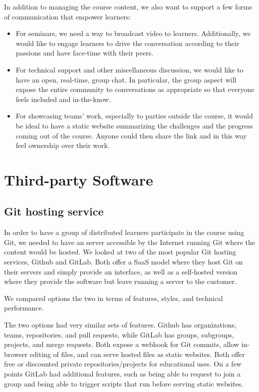 \documentclass[12pt,twoside,vi]{mitthesis}
\begin{document}
In addition to managing the course content, we also want to support a few forms of communication that empower learners:
\begin{itemize}
\item For seminars, we need a way to broadcast video to learners. Additionally, we would like to engage learners to drive the conversation according to their passions and have face-time with their peers.
\item For technical support and other miscellaneous discussion, we would like to have an open, real-time, group chat. In particular, the group aspect will expose the entire community to conversations as appropriate so that everyone feels included and in-the-know.
\item For showcasing teams' work, especially to parties outside the course, it would be ideal to have a static website summarizing the challenges and the progress coming out of the course. Anyone could then share the link and in this way feel ownership over their work.
\end{itemize}

\section{Third-party Software}

\subsection{Git hosting service}

In order to have a group of distributed learners participate in the course using Git, we needed to have an server accessible by the Internet running Git where the content would be hosted. We looked at two of the most popular Git hosting services, Github and GitLab. Both offer a SaaS model where they host Git on their servers and simply provide an interface, as well as a self-hosted version where they provide the software but leave running a server to the customer.

We compared options the two in terms of features, styles, and technical performance.

The two options had very similar sets of features. Github has organizations, teams, repositories, and pull requests, while GitLab has groups, subgroups, projects, and merge requests. Both expose a webhook for Git commits, allow in-browser editing of files, and can serve hosted files as static websites. Both offer free or discounted private repositories/projects for educational uses. On a few points GitLab had additional features, such as being able to request to join a group and being able to trigger scripts that run before serving static websites.
\end{document}
